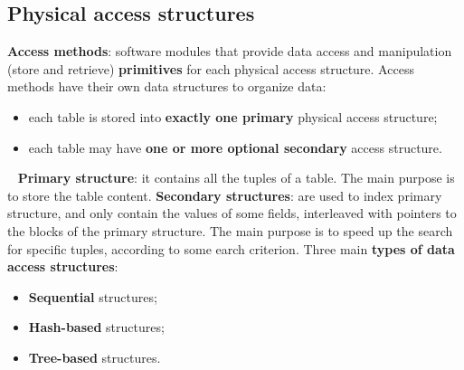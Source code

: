 \subsection{Physical access structures}
\textbf{Access methods}: software modules that provide data access and manipulation (store and retrieve) \textbf{primitives} for each physical access structure.\newline
\newline
Access methods have their own data structures to organize data:
\begin{itemize}
    \item each table is stored into \textbf{exactly one primary} physical access structure;
    \item each table may have \textbf{one or more optional secondary} access structure.
\end{itemize}
\ \newline
\textbf{Primary structure}: it contains all the tuples of a table. The main purpose is to store the table content.\newline
\newline
\textbf{Secondary structures}: are used to index primary structure, and only contain the values of some fields, interleaved with pointers to the blocks of the primary structure. The main purpose is to speed up the search for specific tuples, according to some earch criterion.\newline
\newline
Three main \textbf{types of data access structures}:
\begin{itemize}
    \item \textbf{Sequential} structures;
    \item \textbf{Hash-based} structures;
    \item \textbf{Tree-based} structures.
\end{itemize}
